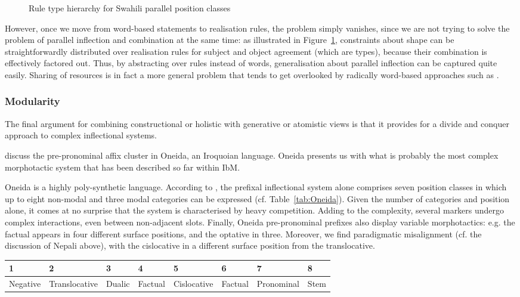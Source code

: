\documentclass[output=paper
                ,modfonts
                ,nonflat
	        ,collection
	        ,collectionchapter
	        ,collectiontoclongg
 	        ,biblatex
                ,babelshorthands
                ,newtxmath
                ,draftmode
                ,colorlinks, citecolor=brown
] {langscibook}
\begin{document}
{\begin{figure}[htb]
  \caption{Rule type hierarchy for Swahili parallel position classes \citep{Crysmann:Bonami:2016}}
  \label{fig:Swahili}
\end{figure}

However, once we move from word-based statements to realisation rules,
the problem simply vanishes, since we are not trying to solve the
problem of parallel inflection and combination at the same time: as
illustrated in Figure~\ref{fig:Swahili}, constraints about shape can
be straightforwardly distributed over realisation rules for subject
and object agreement (which are types), because their combination is
effectively factored out. Thus, by abstracting over rules instead of
words, generalisation about parallel inflection can be captured quite
easily. Sharing of resources is in fact a more general problem that
tends to get overlooked by radically word-based approaches such as
\citet{Blevins14}.

\subsubsection{Modularity}

The final argument for combining constructional or holistic with
generative or atomistic views is that it provides for a divide and
conquer approach to complex inflectional systems.

\citet{diaz:koenig:michelson:19} discuss the pre-pronominal affix
cluster in Oneida, an Iroquoian language. Oneida presents us with what
is probably the most complex morphotactic system that has been
described so far within IbM.

Oneida is a highly poly-synthetic language. According to
\citet{diaz:koenig:michelson:19}, the prefixal inflectional system alone
comprises seven  position classes in which up to eight
non-modal and three modal categories can be expressed
(cf. Table~\ref{tab:Oneida}). Given the number of categories and
position alone, it comes at no surprise that the system is
characterised by heavy competition. Adding to the complexity, several
markers undergo complex interactions, even between non-adjacent slots.
Finally, Oneida pre-pronominal prefixes also display variable
morphotactics: e.g. the factual appears in four different surface
positions, and the optative in three. Moreover, we find paradigmatic
misalignment (cf. the discussion of Nepali above), with the
cislocative in a different surface position from the translocative.

\begin{table}[htb]
  \centering
  \scriptsize
  \begin{tabular}{l|l|l|l|l|l|l|l}
    \toprule
    1&2&3&4&5&6&7&8\\
    \midrule    Negative & Translocative & Dualic & Factual & Cislocative &
                                                                Factual
               & Pronominal & Stem\\


\end{tabular}
\end{table}}
\end{document}
